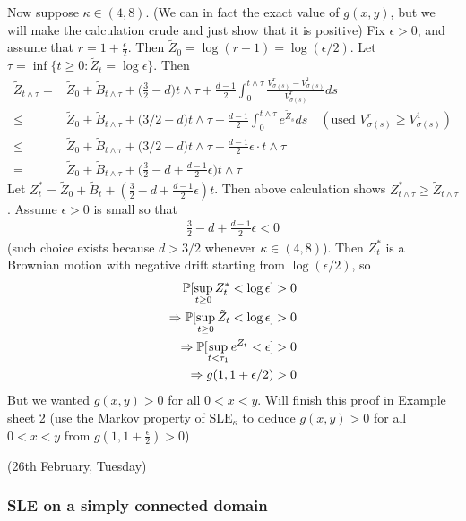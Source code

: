 \documentclass[12pt,a4paper]{article}
\begin{document}
Now suppose $\kappa \in (4,8)$. (We can in fact the exact value of $g(x,y)$, but we will make the calculation crude and just show that it is positive) Fix $\epsilon >0$, and assume that $r= 1+ \frac{\epsilon}{2}$. Then $\tilde{Z}_0 =\log(r-1) = \log(\epsilon /2)$. Let $\tau = \inf \{ t\geq 0 : \tilde{Z}_t = \log \epsilon \}$. Then
\begin{align*}
\tilde{Z}_{t\wedge \tau} =& \tilde{Z}_0 + \tilde{B}_{t\wedge \tau} + \Big(\frac{3}{2} - d\Big) t\wedge \tau + \frac{d-1}{2} \int_0^{t\wedge \tau} \frac{ V_{\sigma(s)}^r -  V_{\sigma(s)}^1 }{V_{\sigma(s)}^r} ds \\
\leq& \tilde{Z}_0 + \tilde{B}_{t\wedge \tau} + \Big(3/2 -d\Big) t\wedge \tau + \frac{d-1}{2} \int_{0}^{t\wedge \tau} e^{\tilde{Z}_s} ds \quad (\text{used } V_{\sigma(s)}^r \geq V_{\sigma(s)}^1) \\
\leq& \tilde{Z}_0 + \tilde{B}_{t\wedge \tau} + \Big(3/2 -d\Big) t\wedge \tau + \frac{d-1}{2} \epsilon \cdot t\wedge \tau \\
=&\tilde{Z}_0 + \tilde{B}_{t\wedge \tau} + \Big( \frac{3}{2} - d+ \frac{d-1}{2}\epsilon \Big) t\wedge \tau
\end{align*}
Let $Z^*_t = \tilde{Z}_0 + \tilde{B}_t + (\frac{3}{2} - d+ \frac{d-1}{2} \epsilon)t$. Then above calculation shows $Z^*_{t\wedge \tau } \geq \tilde{Z}_{t\wedge \tau}$. Assume $\epsilon >0$ is small so that
\begin{align*}
\frac{3}{2} - d + \frac{d-1}{2} \epsilon  < 0 
\end{align*}
(such choice exists because $d>3/2$ whenever $\kappa \in(4,8)$). Then $Z^*_t$ is a Brownian motion with negative drift starting from $\log(\epsilon/2)$, so
\begin{align*}
\mathbb{P}[ \sup_{t\geq 0} Z_t^* < \log \epsilon ]>0 \\
\Rightarrow \mathbb{P} [\sup_{t\geq 0} \tilde{Z}_t < \log \epsilon ]>0 \\
\Rightarrow \mathbb{P} [\sup_{t< \tau_1} e^{Z_t} < \epsilon] > 0 \\
\Rightarrow g(1, 1+ \epsilon/2) >0
\end{align*}
But we wanted $g(x,y)>0$ for all $0< x<y$. Will finish this proof in Example sheet 2 (use the Markov property of $\text{SLE}_{\kappa}$ to deduce $g(x,y)>0$ for all $0<x<y$ from $g(1, 1+ \frac{\epsilon}{2}) >0$)
\s

\newday

(26th February, Tuesday)

\subsubsection*{SLE on a simply connected domain}
\end{document}

